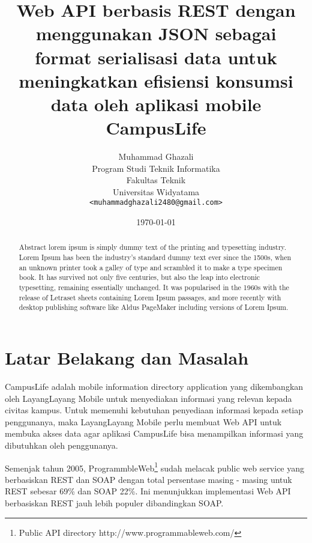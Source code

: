 \documentclass[a4paper, 12pt]{report}
\title{\textbf{Web API berbasis REST dengan menggunakan JSON sebagai format serialisasi data untuk meningkatkan efisiensi konsumsi data oleh aplikasi mobile CampusLife}}
\author{
Muhammad Ghazali\\
Program Studi Teknik Informatika\\
Fakultas Teknik\\
Universitas Widyatama
\\ \texttt{<muhammadghazali2480@gmail.com>}
}
\date{\today}
\begin{document}
\maketitle

\tableofcontents
\setcounter{tocdepth}{3}

\listoffigures
\listoftables

\begin{abstract}
\onehalfspacing Abstract lorem ipsum is simply dummy text of the printing and typesetting industry. Lorem Ipsum has been the industry's standard dummy text ever since the 1500s, when an unknown printer took a galley of type and scrambled it to make a type specimen book. It has survived not only five centuries, but also the leap into electronic typesetting, remaining essentially unchanged. It was popularised in the 1960s with the release of Letraset sheets containing Lorem Ipsum passages, and more recently with desktop publishing software like Aldus PageMaker including versions of Lorem Ipsum.
\end{abstract}

\section*{Latar Belakang dan Masalah}
\onehalfspacing CampusLife adalah mobile information directory application yang dikembangkan oleh LayangLayang Mobile untuk menyediakan informasi yang relevan kepada civitas kampus. Untuk memenuhi kebutuhan penyediaan informasi kepada setiap penggunanya, maka LayangLayang Mobile perlu membuat Web API untuk membuka akses data agar aplikasi CampusLife bisa menampilkan informasi yang dibutuhkan oleh penggunanya.

\onehalfspacing Semenjak tahun 2005, ProgrammbleWeb\footnote{Public API directory http://www.programmableweb.com/} sudah melacak public web service yang berbasiskan REST dan SOAP dengan total persentase masing - masing untuk REST sebesar 69\% dan SOAP 22\%. Ini menunjukkan implementasi Web API berbasiskan REST jauh lebih populer dibandingkan SOAP.\cite{programmableweb-apis}
\end{document}
